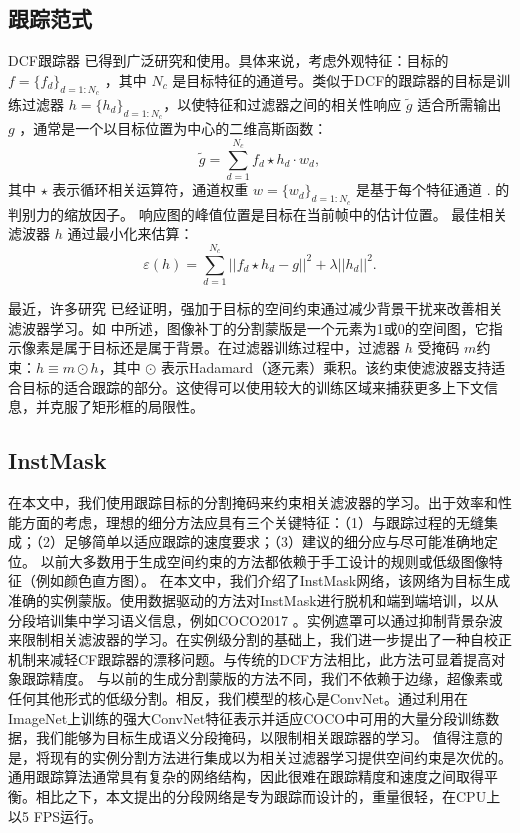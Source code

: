 \subsection{跟踪范式}
DCF跟踪器 \cite{Danelljan2014AccurateSE, henriques2014high-speed, Li2014ASA} 已得到广泛研究和使用。具体来说，考虑外观特征：目标的 $f=\{f_d\}_{d=1:N_c}$ ，其中 $N_c$ 是目标特征的通道号。类似于DCF的跟踪器的目标是训练过滤器 $h=\{h_d\}_{d=1:N_c}$，以使特征和过滤器之间的相关性响应 $\tilde{g}$ 适合所需输出 $g$ ，通常是一个以目标位置为中心的二维高斯函数： 
\begin{equation} \label{eq:dcf}
\tilde{g}=\sum_{d=1}^{N_c}f_d \star h_d \cdot w_d,
\end{equation}
其中 $\star$ 表示循环相关运算符，通道权重 $w = \{w_d\}_{d=1:N_c}$ 是基于每个特征通道 \cite{Lukezic2017DiscriminativeCF}.
的判别力的缩放因子。
响应图的峰值位置是目标在当前帧中的估计位置。
最佳相关滤波器 $h$ 通过最小化来估算：
\begin{equation}
\varepsilon(h) = \sum_{d=1}^{N_c}||f_d \star h_d - g||^2+\lambda||h_d||^2.
\end{equation}

最近，许多研究 \cite{Danelljan2015LearningSR, Lukezic2017DiscriminativeCF} 已经证明，强加于目标的空间约束通过减少背景干扰来改善相关滤波器学习。如 \cite{Lukezic2017DiscriminativeCF}中所述，图像补丁的分割蒙版是一个元素为1或0的空间图，它指示像素是属于目标还是属于背景。在过滤器训练过程中，过滤器 $h$ 受掩码 $m$约束：$h \equiv m \odot h$，其中 $\odot$ 表示Hadamard（逐元素）乘积。该约束使滤波器支持适合目标的适合跟踪的部分。这使得可以使用较大的训练区域来捕获更多上下文信息，并克服了矩形框的局限性。

\subsection{InstMask}
\label{sec:InstMask}
在本文中，我们使用跟踪目标的分割掩码来约束相关滤波器的学习。出于效率和性能方面的考虑，理想的细分方法应具有三个关键特征：（1）与跟踪过程的无缝集成；（2）足够简单以适应跟踪的速度要求；（3）建议的细分应与尽可能准确地定位。
以前大多数用于生成空间约束的方法都依赖于手工设计的规则或低级图像特征（例如颜色直方图）。
在本文中，我们介绍了InstMask网络，该网络为目标生成准确的实例蒙版。使用数据驱动的方法对InstMask进行脱机和端到端培训，以从分段培训集中学习语义信息，例如COCO2017 \cite{COCO}。实例遮罩可以通过抑制背景杂波来限制相关滤波器的学习。在实例级分割的基础上，我们进一步提出了一种自校正机制来减轻CF跟踪器的漂移问题。与传统的DCF方法相比，此方法可显着提高对象跟踪精度。
与以前的生成分割蒙版的方法不同，我们不依赖于边缘，超像素或任何其他形式的低级分割。相反，我们模型的核心是ConvNet。通过利用在ImageNet上训练的强大ConvNet特征表示并适应COCO中可用的大量分段训练数据，我们能够为目标生成语义分段掩码，以限制相关跟踪器的学习。
值得注意的是，将现有的实例分割方法进行集成以为相关过滤器学习提供空间约束是次优的。通用跟踪算法通常具有复杂的网络结构，因此很难在跟踪精度和速度之间取得平衡。相比之下，本文提出的分段网络是专为跟踪而设计的，重量很轻，在CPU上以5 FPS运行。

